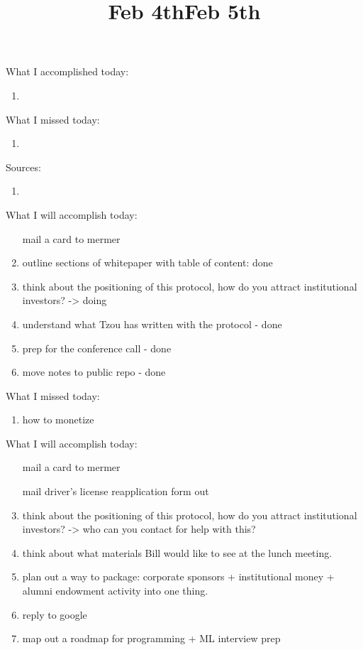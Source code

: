 What I accomplished today:

	
\begin{enumerate}
	\item
\end{enumerate}


What I missed today: 

\begin{enumerate}
	\item 
\end{enumerate}

Sources:

\begin{enumerate}
	\item 
\end{enumerate}

\title{Feb 4th}

What I will accomplish today:

\begin{enumerate}
	\item [mail a card to mermer]
	\item outline sections of whitepaper with table of content:  done
	\item think about the positioning of this protocol, how do you attract institutional investors?  -> doing
	\item understand what Tzou has written with the protocol  - done
	\item prep for the conference call - done
	\item move notes to public repo - done
\end{enumerate}

What I missed today: 

\begin{enumerate}
	\item how to monetize
\end{enumerate}



\title{Feb 5th}

What I will accomplish today:

\begin{enumerate}
	\item [mail a card to mermer]
	\item [mail driver's license reapplication form out]
	\item think about the positioning of this protocol, how do you attract institutional investors?   -> who can you contact for help with this?
	\item think about what materials Bill would like to see at the lunch meeting.
	\item plan out a way to package: corporate sponsors + institutional money + alumni endowment activity  into one thing. 
	\item reply to google
	\item map out a roadmap for programming + ML interview prep
\end{enumerate}


